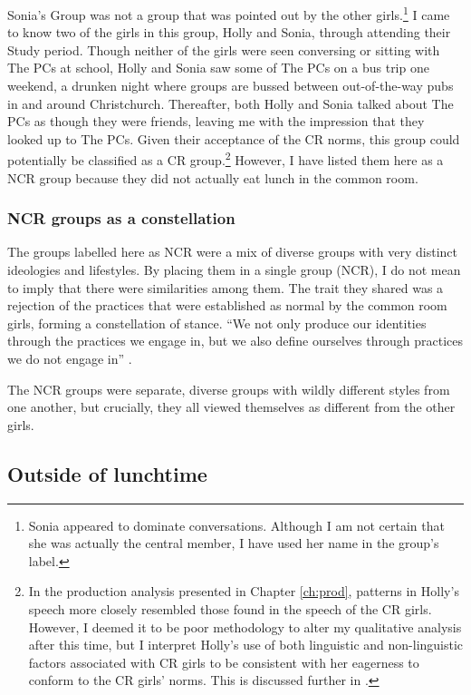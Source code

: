 Sonia's Group was not a group that was pointed out by the other girls.\footnote{Sonia appeared to dominate conversations. Although I am not certain that she was actually the central member, I have used her name in the group's label.}  I came to know two of the girls in this group, Holly and Sonia, through attending their Study period. Though neither of the girls were seen conversing or sitting with The PCs at school, Holly and Sonia saw some of The PCs on a bus trip one weekend, a drunken night where groups are bussed between out-of-the-way pubs in and around Christchurch. Thereafter, both Holly and Sonia talked about The PCs as though they were friends, leaving me with the impression that they looked up to The PCs. Given their acceptance of the CR norms, this group could potentially be classified as a CR group.\footnote{In the production analysis presented in Chapter \ref{ch:prod}, patterns in Holly's speech more closely resembled those found in the speech of the CR girls. However, I deemed it to be poor methodology to alter my qualitative analysis after this time,  but I interpret Holly's use of both linguistic and non-linguistic factors associated with CR girls to be consistent with her eagerness to conform to the CR girls' norms. This is discussed further in .}  However, I have listed them here as a NCR group because they did not actually eat lunch in the common room.

\subsubsection{NCR groups as a constellation}

The groups labelled here as NCR were a mix of diverse groups with very distinct ideologies and lifestyles. By placing them in a single group (NCR), I do not mean to imply that there were similarities among them. The trait they shared was a rejection of the practices that were established as normal by the common room girls, forming a constellation of stance.	``We not only produce our identities through the practices we engage in, but we also define ourselves through practices we do not engage in'' \citep[164]{wenger1998}.

\largerpage

 The NCR groups were separate, diverse groups with wildly different styles from one another, but crucially, they all viewed themselves as different from the other girls. 


\subsection{Outside of lunchtime}

